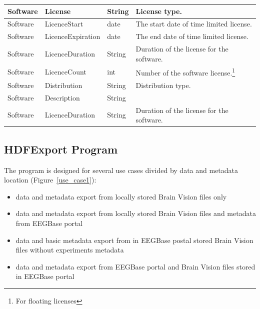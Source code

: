 \documentclass[conference]{IEEEtran}
\begin{document}
\begin{savenotes}
\begin{table}
\begin{tabular}{ | l | l | l | p{3cm} |}
 	\hline
 	Software & License & String & License type.\\
 	\hline
 	Software & LicenceStart & date & The start date of time limited license.\\ 		\hline
 	Software & LicenceExpiration & date & The end date of time limited license.\\ 		\hline
 	Software & LicenceDuration & String & Duration of the license for the software.\\ 		\hline
 	Software & LicenceCount & int & Number of the software license.\footnote{For floating licenses}\\ 		\hline
 	Software & Distribution & String & Distribution type.\\ 		\hline
 	Software & Description & String & \\ 		\hline
 	Software & LicenceDuration & String & Duration of the license for the software.\\ 		\hline
 \end{tabular}

 \end{table}
 \end{savenotes}
\subsection{HDFExport Program}
The program is designed for several use cases divided by data and metadata location (Figure~\ref{use_case1}):
\begin{itemize}
	\item data and metadata export from locally stored Brain Vision files only
	\item data and metadata export from locally stored Brain Vision files and metadata from EEGBase portal
	\item data and basic metadata export from in EEGBase postal stored Brain Vision files without experiments metadata
	\item data and metadata export from EEGBase portal and Brain Vision files stored in EEGBase portal
\end{itemize}
\end{document}
